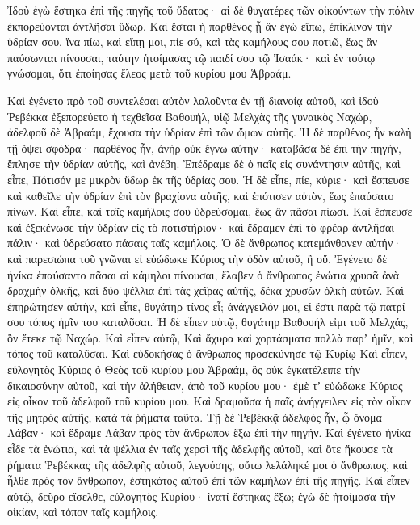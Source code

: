 {Ἰδοὺ ἐγὼ ἕστηκα ἐπὶ τῆς πηγῆς τοῦ ὕδατος· αἱ δὲ θυγατέρες τῶν οἰκούντων τὴν πόλιν ἐκπορεύονται ἀντλῆσαι ὕδωρ.
Καὶ ἔσται ἡ παρθένος ᾗ ἂν ἐγὼ εἴπω, ἐπίκλινον τὴν ὑδρίαν σου, ἵνα πίω, καὶ εἴπῃ μοι, πίε σύ, καὶ τὰς καμήλους σου ποτιῶ, ἕως ἂν παύσωνται πίνουσαι, ταύτην ἡτοίμασας τῷ παιδί σου τῷ Ἰσαάκ· καὶ ἐν τούτῳ γνώσομαι, ὅτι ἐποίησας ἔλεος μετὰ τοῦ κυρίου μου Ἁβραάμ.
\par }{\PP {}Καὶ ἐγένετο πρὸ τοῦ συντελέσαι αὐτὸν λαλοῦντα ἐν τῇ διανοίᾳ αὐτοῦ, καὶ ἰδοὺ Ῥεβέκκα ἐξεπορεύετο ἡ τεχθεῖσα Βαθουήλ, υἱῷ Μελχὰς τῆς γυναικὸς Ναχώρ, ἀδελφοῦ δὲ Ἁβραάμ, ἔχουσα τὴν ὑδρίαν ἐπὶ τῶν ὤμων αὐτῆς.
Ἡ δὲ παρθένος ἦν καλὴ τῇ ὄψει σφόδρα· παρθένος ἦν, ἀνὴρ οὐκ ἔγνω αὐτήν· καταβᾶσα δὲ ἐπὶ τὴν πηγὴν, ἔπλησε τὴν ὑδρίαν αὐτῆς, καὶ ἀνέβη.
Ἐπέδραμε δὲ ὁ παῖς εἰς συνάντησιν αὐτῆς, καὶ εἶπε, Πότισόν με μικρὸν ὕδωρ ἐκ τῆς ὑδρίας σου.
Ἡ δὲ εἶπε, πίε, κύριε· καὶ ἔσπευσε καὶ καθεῖλε τὴν ὑδρίαν ἐπὶ τὸν βραχίονα αὐτῆς, καὶ ἐπότισεν αὐτὸν, ἕως ἐπαύσατο πίνων.
Καὶ εἶπε, καὶ ταῖς καμήλοις σου ὑδρεύσομαι, ἕως ἂν πᾶσαι πίωσι.
Καὶ ἔσπευσε καὶ ἐξεκένωσε τὴν ὑδρίαν εἰς τὸ ποτιστήριον· καὶ ἔδραμεν ἐπὶ τὸ φρέαρ ἀντλῆσαι πάλιν· καὶ ὑδρεύσατο πάσαις ταῖς καμήλοις.
Ὁ δὲ ἄνθρωπος κατεμάνθανεν αὐτήν· καὶ παρεσιώπα τοῦ γνῶναι εἰ εὐώδωκε Κύριος τὴν ὁδὸν αὐτοῦ, ἢ οὔ.
Ἐγένετο δὲ ἡνίκα ἐπαύσαντο πᾶσαι αἱ κάμηλοι πίνουσαι, ἔλαβεν ὁ ἄνθρωπος ἐνώτια χρυσᾶ ἀνὰ δραχμὴν ὁλκῆς, καὶ δύο ψέλλια ἐπὶ τὰς χεῖρας αὐτῆς, δέκα χρυσῶν ὁλκὴ αὐτῶν.
Καὶ ἐπηρώτησεν αὐτὴν, καὶ εἶπε, θυγάτηρ τίνος εἶ; ἀνάγγειλόν μοι, εἰ ἔστι παρὰ τῷ πατρί σου τόπος ἡμῖν του καταλῦσαι.
Ἡ δὲ εἶπεν αὐτῷ, θυγάτηρ Βαθουήλ εἰμι τοῦ Μελχάς, ὃν ἔτεκε τῷ Ναχώρ.
Καὶ εἶπεν αὐτῷ, Καὶ ἄχυρα καὶ χορτάσματα πολλὰ παρʼ ἡμῖν, καὶ τόπος τοῦ καταλῦσαι.
Καὶ εὐδοκήσας ὁ ἄνθρωπος προσεκύνησε τῷ Κυρίῳ
Καὶ εἶπεν, εὐλογητὸς Κύριος ὁ Θεὸς τοῦ κυρίου μου Ἁβραάμ, ὃς οὐκ ἐγκατέλειπε τὴν δικαιοσύνην αὐτοῦ, καὶ τὴν ἀλήθειαν, ἀπὸ τοῦ κυρίου μου· ἐμὲ τʼ εὐώδωκε Κύριος εἰς οἶκον τοῦ ἀδελφοῦ τοῦ κυρίου μου.
Καὶ δραμοῦσα ἡ παῖς ἀνήγγειλεν εἰς τὸν οἶκον τῆς μητρὸς αὐτῆς, κατὰ τὰ ῥήματα ταῦτα.
Τῇ δὲ Ῥεβέκκᾷ ἀδελφὸς ἦν, ᾧ ὄνομα Λάβαν· καὶ ἔδραμε Λάβαν πρὸς τὸν ἄνθρωπον ἔξω ἐπὶ τὴν πηγήν.
Καὶ ἐγένετο ἡνίκα εἶδε τὰ ἐνώτια, καὶ τὰ ψέλλια ἐν ταῖς χερσὶ τῆς ἀδελφῆς αὐτοῦ, καὶ ὅτε ἤκουσε τὰ ῥήματα Ῥεβέκκας τῆς ἀδελφῆς αὐτοῦ, λεγούσης, οὕτω λελάληκέ μοι ὁ ἄνθρωπος, καὶ ἦλθε πρὸς τὸν ἄνθρωπον, ἑστηκότος αὐτοῦ ἐπὶ τῶν καμήλων ἐπὶ τῆς πηγῆς.
Καὶ εἶπεν αὐτῷ, δεῦρο εἴσελθε, εὐλογητὸς Κυρίου· ἱνατί ἕστηκας ἔξω; ἐγὼ δὲ ἡτοίμασα τὴν οἰκίαν, καὶ τόπον ταῖς καμήλοις.
}
